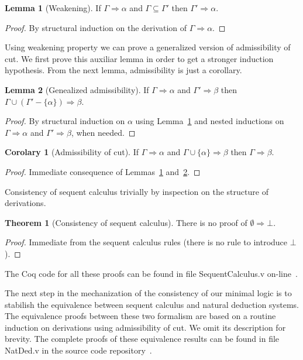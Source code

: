 \documentclass[12pt]{article}
\theoremstyle{definition}
\newtheorem{Theorem}{Theorem}
\newtheorem{Corolary}{Corolary}
\newtheorem{Lemma}{Lemma}
\begin{document}
\begin{Lemma}[Weakening]\label{lemma:weak}
  If $\Gamma \Rightarrow \alpha$ and $\Gamma \subseteq \Gamma'$ then $\Gamma'
  \Rightarrow \alpha$.
\end{Lemma}
\begin{proof}
  By structural induction on the derivation of $\Gamma \Rightarrow \alpha$.
\end{proof}

Using weakening property we can prove a generalized version of admissibility of
cut. We first prove this auxiliar lemma in order to get a stronger induction
hypothesis. From the next lemma, admissibility is just a corollary.

\begin{Lemma}[Genealized admissibility]\label{lemma:admissibility}
  If $\Gamma \Rightarrow \alpha$ and $\Gamma' \Rightarrow \beta$ then $\Gamma
  \cup (\Gamma' - \{\alpha\}) \Rightarrow \beta$.
\end{Lemma}
\begin{proof}
  By structural induction on $\alpha$ using Lemma~\ref{lemma:weak} and
  nested inductions on $\Gamma \Rightarrow \alpha$ and
  $\Gamma' \Rightarrow \beta$, when needed.
\end{proof}

\begin{Corolary}[Admissibility of cut]
  If $\Gamma \Rightarrow \alpha$ and $\Gamma \cup\{\alpha\}\Rightarrow \beta$
  then $\Gamma \Rightarrow \beta$.
\end{Corolary}
\begin{proof}
  Immediate consequence of Lemmas~\ref{lemma:weak} and~\ref{lemma:admissibility}.
\end{proof}

Consistency of sequent calculus trivially by inspection on the structure of
derivations.

\begin{Theorem}[Consistency of sequent calculus]\label{theorem:consistency}
  There is no proof of $\emptyset \Rightarrow \bot$.
\end{Theorem}
\begin{proof}
  Immediate from the sequent calculus rules (there is no rule to introduce $\bot$).
\end{proof}

The Coq code for all these proofs can be found in file SequentCalculus.v
on-line~\cite{Sasdelli20}.

The next step in the mechanization of the
consistency of our minimal logic is to stabilish the equivalence between sequent
calculus and natural deduction systems. The equivalence proofs between these two
formalism are based on a routine induction on derivations using admissibility of
cut. We omit its description for brevity. The complete proofs of these
equivalence results can be found in file NatDed.v in the source code
repository~\cite{Sasdelli20}.
\end{document}
